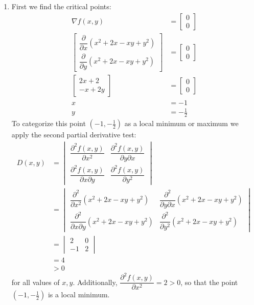  \begin{enumerate}
  \item First we find the critical points:
   \begin{align*}
    \nabla f(x,y) &= \begin{bmatrix} 0 \\ 0 \end{bmatrix} \\
    \begin{bmatrix}
     \dfrac{\partial}{\partial x}(x^2 + 2x - xy + y^2) \\
     \dfrac{\partial}{\partial y}(x^2 + 2x - xy + y^2)
    \end{bmatrix} &= \begin{bmatrix} 0 \\ 0 \end{bmatrix} \\
    \begin{bmatrix}
     2x + 2 \\
     -x + 2y
    \end{bmatrix} &= \begin{bmatrix} 0 \\ 0 \end{bmatrix} \\
    x &= -1 \\
    y &= -\frac{1}{2}
   \end{align*}
   To categorize this point $(-1, -\frac{1}{2})$ as a local minimum or maximum
   we apply the second partial derivative test:
   \begin{align*}
    D(x,y)
    &= \begin{vmatrix}
     \dfrac{\partial^2 f(x,y)}{\partial x^2} &
      \dfrac{\partial^2 f(x,y)}{\partial y \partial x} \\
     \dfrac{\partial^2 f(x,y)}{\partial x \partial y} &
      \dfrac{\partial^2 f(x,y)}{\partial y^2}
    \end{vmatrix} \\
    &= \begin{vmatrix}
     \dfrac{\partial^2}{\partial x^2}(x^2 + 2x - xy + y^2) &
      \dfrac{\partial^2}{\partial y \partial x}(x^2 + 2x - xy + y^2) \\
     \dfrac{\partial^2}{\partial x \partial y}(x^2 + 2x - xy + y^2) &
      \dfrac{\partial^2}{\partial y^2}(x^2 + 2x - xy + y^2)
    \end{vmatrix} \\
    &= \begin{vmatrix} 2 & 0 \\ -1 & 2 \end{vmatrix} \\
    &= 4 \\
    &> 0
   \end{align*}
  for all values of $x,y$.
  Additionally, $\dfrac{\partial^2 f(x,y)}{\partial x^2} = 2 > 0$, so that
  the point $(-1, -\frac{1}{2})$ is a local minimum.


\end{enumerate}
